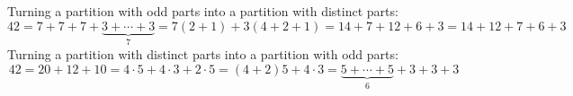 \begin{exl}
Turning a partition with odd parts into a partition with distinct parts:
\[
42 = 7+7+7+\underbrace{3+ \cdots +3}_{7} = 7 (2+1) + 3(4+2+1) = 14 + 7 + 12 + 6 + 3 = 14 + 12 + 7 + 6 + 3
\]
Turning a partition with distinct parts into a partition with odd parts:
\[
42 = 20 + 12 + 10 = 4\cdot 5 + 4 \cdot 3 + 2 \cdot 5 = (4+2)5 + 4\cdot 3 = \underbrace{5+\cdots+5}_{6} + 3 + 3 + 3
\]
\end{exl}